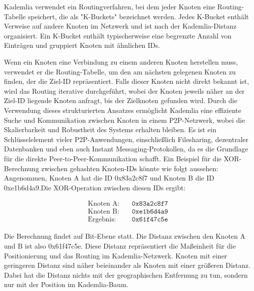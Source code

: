 Kademlia verwendet ein Routingverfahren, bei dem jeder Knoten eine Routing-\\
Tabelle 
speichert, die als "K-Buckets" bezeichnet werden. Jedes K-Bucket enthält Verweise 
auf andere Knoten im Netzwerk und ist nach der Kademlia-Distanz organisiert. Ein 
K-Bucket enthält typischerweise eine begrenzte Anzahl von Einträgen und gruppiert 
Knoten mit ähnlichen IDs.

Wenn ein Knoten eine Verbindung zu einem anderen Knoten herstellen muss, verwendet 
er die Routing-Tabelle, um den am nächsten gelegenen Knoten zu finden, der die 
Ziel-ID repräsentiert. Falls dieser Knoten nicht direkt bekannt ist, wird das 
Routing iterative durchgeführt, wobei der Knoten jeweils näher an der Ziel-ID 
liegende Knoten anfragt, bis der Zielknoten gefunden wird. Durch die Verwendung 
dieses strukturierten Ansatzes ermöglicht Kademlia eine effiziente Suche und 
Kommunikation zwischen Knoten in einem P2P-Netzwerk, wobei die Skalierbarkeit 
und Robustheit des Systems erhalten bleiben. Es ist ein Schlüsselelement vieler 
P2P-Anwendungen, einschließlich Filesharing, dezentraler Datenbanken und eben auch 
Instant Messaging-Protokollen, da es die Grundlage für die direkte 
Peer-to-Peer-Kommunikation schafft.
Ein Beispiel für die XOR-Berechnung zwischen gehashten Knoten-IDs könnte 
wie folgt aussehen:
Angenommen, Knoten A hat die ID 0x83a2c8f7 und Knoten B die ID 0xe1b6d4a9.Die XOR-Operation 
zwischen diesen IDs ergibt:

\begin{equation}
    \begin{aligned}
        \text{Knoten A:} & \quad \texttt{0x83a2c8f7} \\
        \text{Knoten B:} & \quad \texttt{0xe1b6d4a9} \\
        \text{Ergebnis:} & \quad \texttt{0x61f47c5e}
    \end{aligned}
\end{equation}

\noindent Die Berechnung findet auf Bit-Ebene statt. Die Distanz zwischen den Knoten A und B
ist also 0x61f47c5e.
Diese Distanz repräsentiert die Maßeinheit für die Positionierung und das Routing 
im Kademlia-Netzwerk. Knoten mit einer geringeren Distanz sind näher beieinander
als Knoten mit einer größeren Distanz. Dabei hat die Distanz nichts mit der
geographischen Entfernung zu tun, sondern nur mit der Position im Kademlia-Baum.